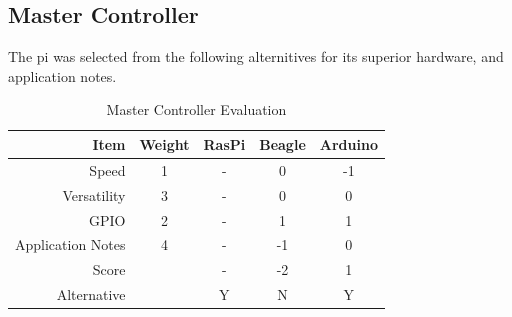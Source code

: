 \subsection{Master Controller}
The \gls{pi} was selected from the following alternitives for its superior hardware, and application notes.
\begin{table}[H]
\caption{Master Controller Evaluation}
	\label{table:MaCEval}
	\centering
\begin{tabular}{|r|c|c|c|c|}
\hline
Item              & Weight & RasPi & Beagle &Arduino \\ \hline
Speed             & 1      & -     & 0                                                     & -1                                                     \\ \hline
Versatility       & 3      & -     & 0                                                     & 0                                                      \\ \hline
GPIO              & 2      & -     & 1                                                     & 1                                                      \\ \hline
Application Notes & 4      & -     & -1                                                    & 0                                                      \\ \hline
Score             &        & -     & -2                                                    & 1                                                      \\ \hline
Alternative       &        & Y     & N                                                    & Y                                                    \\ \hline
\end{tabular}
\end{table}

